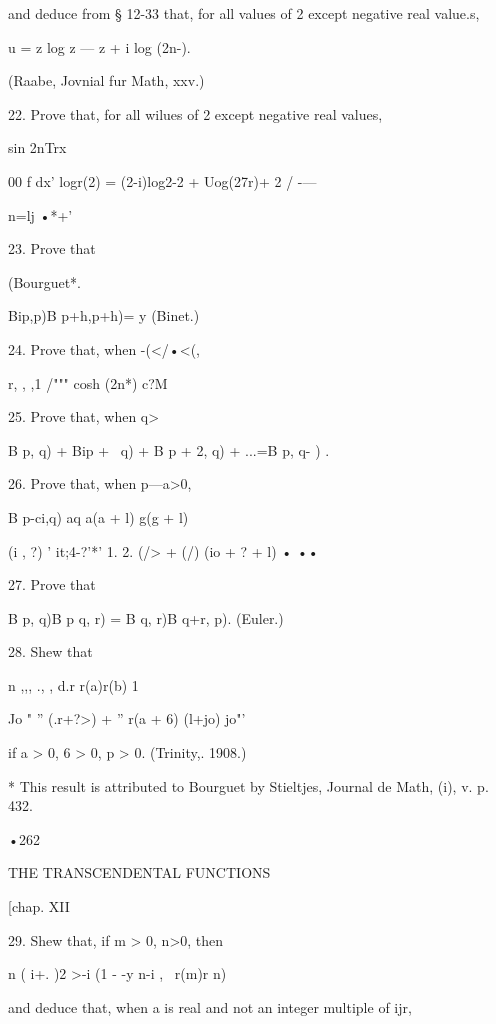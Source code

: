 and deduce from § 12-33 that, for all values of 2 except negative real
value.s,

u = z log z — z + i log (2n-).

(Raabe, Jovnial fur Math, xxv.)

22. Prove that, for all wilues of 2 except negative real values,

sin 2nTrx



00 f dx' logr(2) = (2-i)log2-2 + Uog(27r)+ 2 / -—

n=lj •*+'



23. Prove that



(Bourguet*.



Bip,p)B p+h,p+h)= y (Binet.)

24. Prove that, when -(</•<(,

r, , ,1 /""" cosh (2n*) c?M

25. Prove that, when q>\,

B p, q) + Bip + \, q) + B p + 2, q) + ...=B p, q- ) .

26. Prove that, when p—a>0,

B p-ci,q) aq a(a + l) g(g + l)

 (i , ?) ' it;4-?'*' 1. 2. (/> + (/) (io + ? + l) • ••

27. Prove that

B p, q)B p q, r) = B q, r)B q+r, p). (Euler.)

28. Shew that

n ,,, ., , d.r r(a)r(b) 1

Jo " '' (.r+?>) + '' r(a + 6) (l+jo) jo"'

if a > 0, 6 > 0, p > 0. (Trinity,. 1908.)

* This result is attributed to Bourguet by Stieltjes, Journal de Math,
(i), v. p. 432.



•262



THE TRANSCENDENTAL FUNCTIONS



[chap. XII



29. Shew that, if m > 0, n>0, then

n ( i+. )2 >-i (1 - -y n-i , \ r(m)r n)

and deduce that, when a is real and not an integer multiple of ijr,

